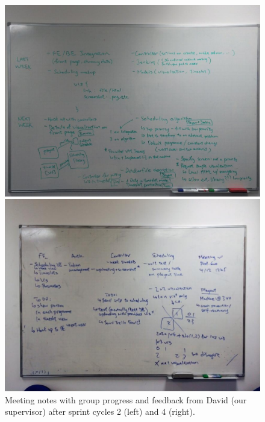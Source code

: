 \documentclass[a4paper]{article}
\begin{document}
\begin{figure}[H]
  \begin{minipage}{0.49\textwidth}
    \includegraphics[width = \textwidth, trim = 0 0.4cm 0 1.6cm, clip]{./evaluation/meeting-board2.jpg}
  \end{minipage}
  \begin{minipage}{0.49\textwidth}
    \includegraphics[width = \textwidth, trim = 1.2cm 1.5cm 1.2cm 2.5cm, clip]{./evaluation/meeting-board.jpg}
  \end{minipage}
  \caption{Meeting notes with group progress and feedback from David (our supervisor) after sprint cycles 2 (left) and 4 (right).}
  \label{fig:meetingboard}
\end{figure}
\end{document}
